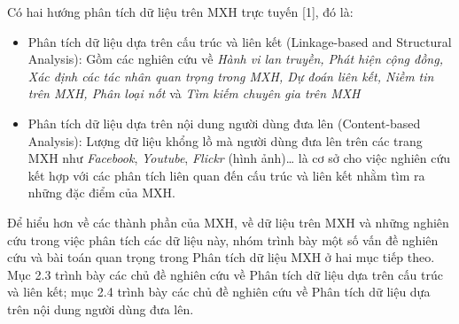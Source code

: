 \documentclass[12pt]{extarticle}
\begin{document}
			\par Có hai hướng phân tích dữ liệu trên MXH trực tuyến [1], đó là:
			\begin{itemize}
				\item{Phân tích dữ liệu dựa trên cấu trúc và liên kết (Linkage-based and Structural Analysis): Gồm các nghiên cứu về \textit{Hành vi lan truyền, Phát hiện cộng đồng, Xác định các tác nhân quan trọng trong MXH, Dự đoán liên kết, Niềm tin trên MXH, Phân loại nốt} và \textit{Tìm kiếm chuyên gia trên MXH}}	
				\item{Phân tích dữ liệu dựa trên nội dung người dùng đưa lên (Content-based Analysis): Lượng dữ liệu khổng lồ mà người dùng đưa lên trên các trang MXH như \textit{Facebook}, \textit{Youtube}, \textit{Flickr} (hình ảnh)… là cơ sở cho việc nghiên cứu kết hợp với các phân tích liên quan đến cấu trúc và liên kết nhằm tìm ra những đặc điểm của MXH.}
			\end{itemize}
			\par Để hiểu hơn về các thành phần của MXH, về dữ liệu trên MXH và những nghiên cứu trong việc phân tích các dữ liệu này, nhóm trình bày một số vấn đề nghiên cứu và bài toán quan trọng trong Phân tích dữ liệu MXH ở hai mục tiếp theo. Mục 2.3 trình bày các chủ đề nghiên cứu về Phân tích dữ liệu dựa trên cấu trúc và liên kết; mục 2.4 trình bày các chủ đề nghiên cứu về Phân tích dữ liệu dựa trên nội dung người dùng đưa lên.
\end{document}
